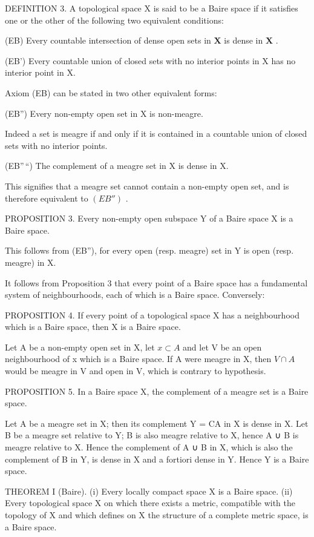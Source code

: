 DEFINITION 3. A topological space X is said to be a Baire space if it satisfies one or the other of the following two equivalent conditions:

(EB) Every countable intersection of dense open sets in \(\mathbf{X}\) is dense in \(\mathbf{X}\) .

(EB') Every countable union of closed sets with no interior points in X has no interior point in X.

Axiom (EB) can be stated in two other equivalent forms:

(EB'') Every non-empty open set in X is non-meagre.

Indeed a set is meagre if and only if it is contained in a countable union of closed sets with no interior points.

(EB''\,``) The complement of a meagre set in X is dense in X.

This signifies that a meagre set cannot contain a non-empty open set, and is therefore equivalent to \((EB'')\) .

PROPOSITION 3. Every non-empty open subspace Y of a Baire space X is a Baire space.

This follows from (EB''), for every open (resp. meagre) set in Y is open (resp. meagre) in X.

It follows from Proposition 3 that every point of a Baire space has a fundamental system of neighbourhoods, each of which is a Baire space. Conversely:

PROPOSITION 4. If every point of a topological space X has a neighbourhood which is a Baire space, then X is a Baire space.

Let A be a non-empty open set in X, let \(x \subset A\) and let V be an open neighbourhood of x which is a Baire space. If A were meagre in X, then \(V \cap A\) would be meagre in V and open in V, which is contrary to hypothesis.

PROPOSITION 5. In a Baire space X, the complement of a meagre set is a Baire space.

Let A be a meagre set in X; then its complement Y = CA in X is dense in X. Let B be a meagre set relative to Y; B is also meagre relative to X, hence A ∪ B is meagre relative to X. Hence the complement of A ∪ B in X, which is also the complement of B in Y, is dense in X and a fortiori dense in Y. Hence Y is a Baire space.

THEOREM I (Baire). (i) Every locally compact space X is a Baire space. (ii) Every topological space X on which there exists a metric, compatible with the topology of X and which defines on X the structure of a complete metric space, is a Baire space.


